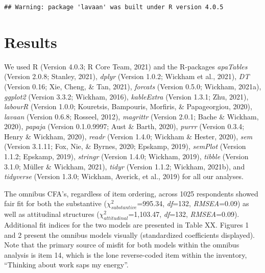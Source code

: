 \documentclass[
  english,
  man]{apa6}
\begin{document}
\begin{verbatim}
## Warning: package 'lavaan' was built under R version 4.0.5
\end{verbatim}

\hypertarget{results}{%
\section{Results}\label{results}}

We used R (Version 4.0.3; R Core Team, 2021) and the R-packages \emph{apaTables} (Version 2.0.8; Stanley, 2021), \emph{dplyr} (Version 1.0.2; Wickham et al., 2021), \emph{DT} (Version 0.16; Xie, Cheng, \& Tan, 2021), \emph{forcats} (Version 0.5.0; Wickham, 2021a), \emph{ggplot2} (Version 3.3.2; Wickham, 2016), \emph{kableExtra} (Version 1.3.1; Zhu, 2021), \emph{labourR} (Version 1.0.0; Kouretsis, Bampouris, Morfiris, \& Papageorgiou, 2020), \emph{lavaan} (Version 0.6.8; Rosseel, 2012), \emph{magrittr} (Version 2.0.1; Bache \& Wickham, 2020), \emph{papaja} (Version 0.1.0.9997; Aust \& Barth, 2020), \emph{purrr} (Version 0.3.4; Henry \& Wickham, 2020), \emph{readr} (Version 1.4.0; Wickham \& Hester, 2020), \emph{sem} (Version 3.1.11; Fox, Nie, \& Byrnes, 2020; Epskamp, 2019), \emph{semPlot} (Version 1.1.2; Epskamp, 2019), \emph{stringr} (Version 1.4.0; Wickham, 2019), \emph{tibble} (Version 3.1.0; Müller \& Wickham, 2021), \emph{tidyr} (Version 1.1.2; Wickham, 2021b), and \emph{tidyverse} (Version 1.3.0; Wickham, Averick, et al., 2019) for all our analyses.

The omnibus CFA's, regardless of item ordering, across 1025 respondents showed fair fit for both the substantive (\(\chi^2_{substantive}\)=995.34, \emph{df}=132, \emph{RMSEA}=0.09) as well as attitudinal structures (\(\chi^2_{attitudinal}\)=1,103.47, \emph{df}=132, \emph{RMSEA}=0.09). Additional fit indices for the two models are presented in Table XX. Figures 1 and 2 present the omnibus models visually (standardized coefficients displayed). Note that the primary source of misfit for both models within the omnibus analysis is item 14, which is the lone reverse-coded item within the inventory, \enquote{Thinking about work saps my energy}.
\end{document}
